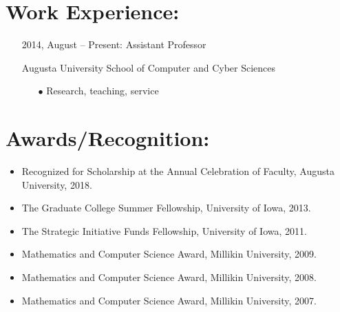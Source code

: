 \documentclass[11pt]{article}
\begin{document}
  


\section{Work Experience:}
\label{sec:work_experience:}
\begin{itemize}
\item[] 2014, August -- Present: Assistant Professor\vspace{-10px}
\item[] Augusta University School of Computer and Cyber Sciences
  \vspace{-10px}
  \begin{itemize}
  \item[$\bullet$] Research, teaching, service
  \end{itemize}
\end{itemize}

\section{Awards/Recognition:}
\label{sec:awards/recognition}
\begin{itemize}\itemsep-2px
\item Recognized for Scholarship at the Annual Celebration of Faculty, Augusta University, 2018.
\item The Graduate College Summer Fellowship, University of Iowa, 2013.
  
\item The Strategic Initiative Funds Fellowship, University of Iowa, 2011.
  
\item Mathematics and Computer Science Award, Millikin University, 2009.  
  
\item Mathematics and Computer Science Award, Millikin University, 2008.  
  
\item Mathematics and Computer Science Award, Millikin University, 2007.
\end{itemize}
\end{document}
